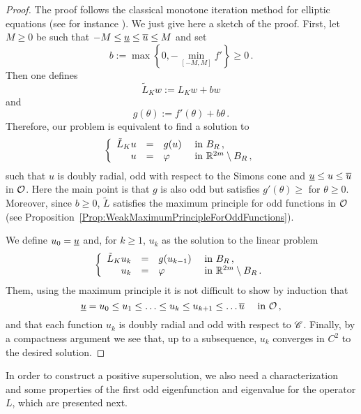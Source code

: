 \begin{proof}
	The proof follows the classical monotone iteration method for elliptic equations (see for instance \cite{Evans}). We just give here a sketch of the proof. 
	First, let $M \geq 0$ be such that $-M \leq \underline{u} \leq \overline{u} \leq M$ and set
	$$
	b := \max \left \{{0, - \min_{[-M,M]}f'}\right \}\geq 0\,.
	$$
	Then one defines 
	$$
	\tilde{L}_K w := L_Kw + b w
	$$
	and
	$$
	g(\theta) := f'(\theta) + b \theta\,.
	$$
	Therefore, our problem is equivalent to find a solution to
	$$
	\left\{\begin{array}{rcll}
	\tilde{L}_Ku & = & g(u) & \textrm{ in } B_R\,, \\
	u &=& \varphi &  \textrm{ in } \mathbb{R}^{2m} \setminus B_R\,, 
	\end{array} \right.
	$$
	such that $u$ is doubly radial, odd with respect to the Simons cone and  $\underline{u} \leq u \leq \overline{u}$ in $\mathcal{O}$. Here the main point is that $g$ is also odd but satisfies $g'(\theta) \geq $ for $\theta \geq 0$. Moreover, since $b \geq 0$, $\tilde{L}$ satisfies the maximum principle for odd functions in $\mathcal{O}$ (see Proposition~\ref{Prop:WeakMaximumPrincipleForOddFunctions}).
	
	We define $u_0 = \underline{u}$ and, for $k\geq 1$, $u_k$ as the solution to the linear problem
	$$
	\left\{\begin{array}{rcll}
	\tilde{L}_K u_k & = & g(u_{k-1}) & \textrm{ in } B_R\,, \\
	u_k &=& \varphi &  \textrm{ in } \mathbb{R}^{2m} \setminus B_R\,. 
	\end{array} \right.
	$$
	Them, using the maximum principle it is not difficult to show by induction that 
	$$
	\underline{u} = u_0 \leq u_1 \leq \ldots \leq u_k \leq u_{k+1} \leq \ldots \overline{u} \quad \text{ in }\mathcal{O}\,,
	$$
	and that each function $u_k$ is doubly radial and odd with respect to $\mathscr{C}$. Finally, by a compactness argument we see that, up to a subsequence, $u_k$ converges in $C^2$ to the desired solution.
\end{proof}

In order to construct a positive supersolution, we also need a characterization and some properties of the first odd eigenfunction and eigenvalue for the operator $L$, which are presented next.


